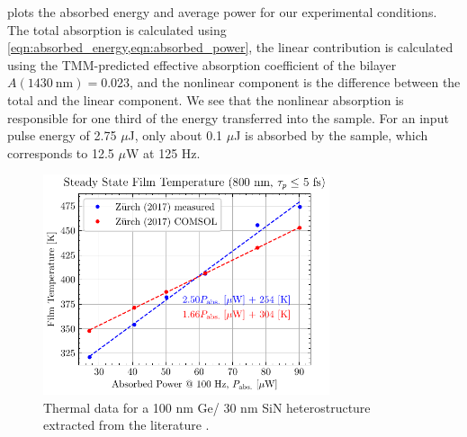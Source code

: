  plots the absorbed energy and average power for our experimental conditions. The total absorption is calculated using \cref{eqn:absorbed_energy,eqn:absorbed_power}, the linear contribution is calculated using the TMM-predicted effective absorption coefficient of the bilayer $A (1430 \ \textrm{nm}) = 0.023$, and the nonlinear component is the difference between the total and the linear component. We see that the nonlinear absorption is responsible for one third of the energy transferred into the sample. For an input pulse energy of 2.75 $\mu$J, only about 0.1 $\mu$J is absorbed by the sample, which corresponds to 12.5 $\mu$W at 125 Hz.

\begin{figure}
	\centering
	\includegraphics[width=0.75\textwidth]{figures/chap4/COMSOL_temp_power.pdf}
	\caption{Thermal data for a 100 nm Ge/ 30 nm SiN heterostructure extracted from the literature \cite{zurchDirectSimultaneousObservation2017}.}
	\label{fig:COMSOL_temp_power}
\end{figure}

